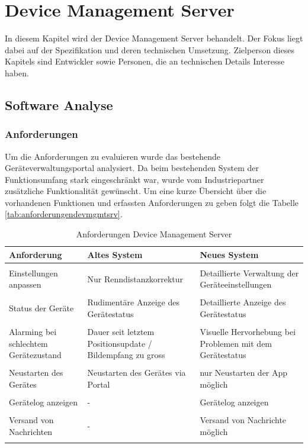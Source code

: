 \chapter{Device Management Server}
\label{sec:devmgmtsrv}

In diesem Kapitel wird der Device Management Server behandelt. Der Fokus liegt dabei auf der Spezifikation und deren technischen Umsetzung. Zielperson dieses Kapitels sind Entwickler sowie Personen, die an technischen Details Interesse haben.

\section{Software Analyse}

\subsection{Anforderungen}
Um die Anforderungen zu evaluieren wurde das bestehende Geräteverwaltungsportal analysiert. Da beim bestehenden System der Funktionsumfang stark eingeschränkt war, wurde vom Industriepartner zusätzliche Funktionalität gewünscht.
Um eine kurze Übersicht über die vorhandenen Funktionen und erfassten Anforderungen zu geben folgt die Tabelle \ref{tab:anforderungendevmgmtsrv}.

\begin{longtable}{  p{3.5cm} | p{4.3cm} | p{4.3cm} }

    \textbf{Anforderung} & \textbf{Altes System} & \textbf{Neues System} \\ [1ex] \hline \hline & &  \\ [-1.5ex]
    Einstellungen anpassen & Nur Renndistanzkorrektur & Detaillierte Verwaltung der Geräteeinstellungen\\ [1ex] \hline & &  \\ [-1.5ex]
    Status der Geräte & Rudimentäre Anzeige des Gerätestatus & Detaillierte Anzeige des Gerätestatus\\ [1ex] \hline & &  \\ [-1.5ex]
     Alarming bei schlechtem Gerätezustand & Dauer seit letztem Positionsupdate / Bildempfang zu gross & Visuelle Hervorhebung bei Problemen mit dem Gerätestatus \\ [1ex] \hline & &  \\ [-1.5ex]
    Neustarten des Gerätes & Neustarten des Gerätes via Portal & nur Neustarten der App möglich\\ [1ex] \hline & &  \\ [-1.5ex]
    Gerätelog anzeigen & - & Gerätelog anzeigen\\ [1ex] \hline & &  \\ [-1.5ex]
    Versand von Nachrichten & - & Versand von Nachrichte möglich\\ [1ex] 
\caption{Anforderungen Device Management Server}
\end{longtable}
\label{tab:anforderungendevmgmtsrv}

